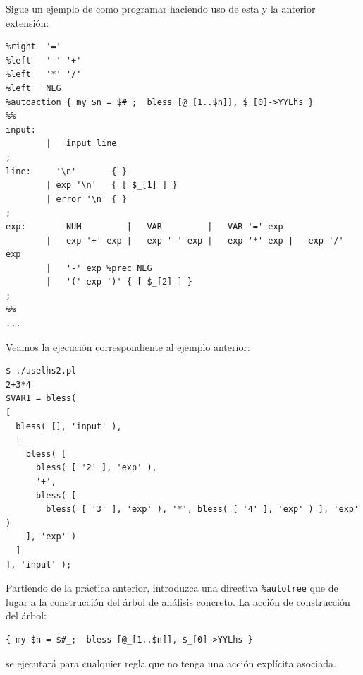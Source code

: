 Sigue un ejemplo de como programar haciendo uso de esta y la 
anterior extensión:
\begin{verbatim}
%right  '='
%left   '-' '+'
%left   '*' '/'
%left   NEG
%autoaction { my $n = $#_;  bless [@_[1..$n]], $_[0]->YYLhs }
%%
input:                 
        |   input line 
;
line:     '\n'       { } 
        | exp '\n'   { [ $_[1] ] } 
        | error '\n' { }
;
exp:        NUM         |   VAR         |   VAR '=' exp         
        |   exp '+' exp |   exp '-' exp |   exp '*' exp |   exp '/' exp      
        |   '-' exp %prec NEG 
        |   '(' exp ')' { [ $_[2] ] }     
;
%%
...
\end{verbatim}
Veamos la ejecución correspondiente al ejemplo anterior:
\begin{verbatim}
$ ./uselhs2.pl
2+3*4
$VAR1 = bless( 
[
  bless( [], 'input' ),
  [
    bless( [
      bless( [ '2' ], 'exp' ),
      '+',
      bless( [
        bless( [ '3' ], 'exp' ), '*', bless( [ '4' ], 'exp' ) ], 'exp' )
    ], 'exp' )
  ]
], 'input' );
\end{verbatim}

Partiendo de la práctica anterior, introduzca una directiva
\verb|%autotree| que de lugar a la construcción del árbol de análisis
concreto. La acción de construcción del árbol:
\begin{verbatim}
{ my $n = $#_;  bless [@_[1..$n]], $_[0]->YYLhs }
\end{verbatim}
se ejecutará para cualquier regla que no tenga una acción
explícita asociada.

